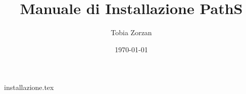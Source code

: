 \documentclass[a4paper, 12pt]{report}
\title{Manuale di Installazione PathS}
\author{Tobia Zorzan}
\date{\today}
\begin{document}
 
\maketitle

\tableofcontents

{installazione.tex} %
\end{document}
